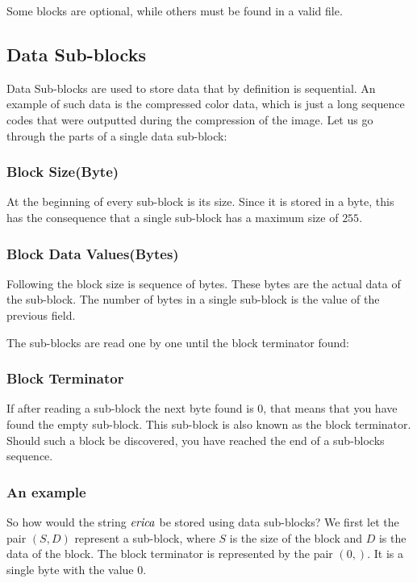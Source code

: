 Some blocks are optional, while others must be found in a valid \gif
file.

\subsection{Data Sub-blocks}
\label{sec:gif-data-sub-blocks}

Data Sub-blocks are used to store data that by definition is
sequential. An example of such data is the compressed color data,
which is just a long sequence codes that were outputted during the
compression of the image. Let us go through the parts of a single data
sub-block:

\subsubsection*{Block Size(Byte)}

At the beginning of every sub-block is its size. Since it is stored in
a byte, this has the consequence that a single sub-block has a maximum
size of $255$.

\subsubsection*{Block Data Values(Bytes)}

Following the block size is sequence of bytes. These bytes are the
actual data of the sub-block. The number of bytes in a single
sub-block is the value of the previous field.

The sub-blocks are read one by one until the block terminator found:

\subsubsection{Block Terminator}

If after reading a sub-block the next byte found is 0, that means
that you have found the empty sub-block. This sub-block is also
known as the block terminator. Should such a block be discovered, you
have reached the end of a sub-blocks sequence.

\subsubsection{An example}

So how would the string $\mathit{erica}$ be stored using data sub-blocks? We
first let the pair $(S,D)$ represent a sub-block, where $S$ is the
size of the block and $D$ is the data of the block. The block
terminator is represented by the pair $(0,)$. It is a single byte with
the value $0$.

